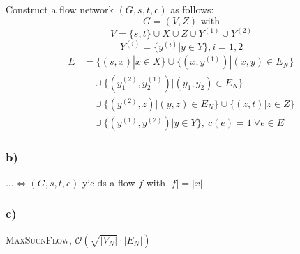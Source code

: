 \documentclass[12pt,oneside,a4paper,parskip=on,fleqn]{scrartcl}
\begin{document}
Construct a flow network $(G,s,t,c)$ as follows:
\[
	G=(V,Z) \text{ with}
\]\[
	V = \{s,t\} \cup X \cup Z \cup Y^{(1)} \cup Y^{(2)}
\]\[
	Y^{(i)} = \{y^{(i)} | y\in Y\}, i=1,2
\]\begin{align*}
	E&= \{ (s,x) | x\in X \} \cup \{ (x,y^{(1)})|(x,y)\in E_N \}\\
		&\quad \cup
		\{ (y_1^{(2)},y_2^{(1)}) | (y_1,y_2) \in E_N \}\\ 
		&\quad \cup \{ (y^{(2)},z) | (y,z) \in E_N \} \cup \{ (z,t) | z\in Z \}\\
		&\quad \cup	\{ (y^{(1)},y^{(2)}) | y\in Y \},\ c(e) = 1\ \forall e\in E
\end{align*}
\subsubsection*{b)}
$\ldots \Leftrightarrow (G,s,t,c)$ yields a flow $f$ with $|f| = |x|$
\subsubsection*{c)}
\textsc{MaxSucnFlow}, $\mathcal{O}(\sqrt{|V_N|} \cdot |E_N|)$
\end{document}
